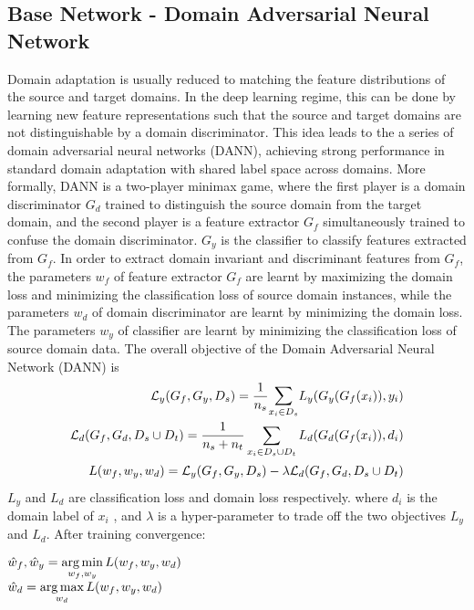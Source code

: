 \subsection{Base Network - Domain Adversarial Neural Network}
Domain adaptation is usually reduced to matching the feature distributions of the source and target domains. In the deep learning regime, this can be done by
learning new feature representations such that the source and target domains
are not distinguishable by a domain discriminator. This idea leads to the a series
of domain adversarial neural networks (DANN)\cite{uda,dann,deeptransfer}, achieving strong performance
in standard domain adaptation with shared label space across domains.
More formally, DANN is a two-player minimax game, where the first player is
a domain discriminator $G_d$ trained to distinguish the source domain from the
target domain, and the second player is a feature extractor $G_f$ simultaneously
trained to confuse the domain discriminator. $G_y$ is the classifier to classify features extracted from $G_f$.
In order to extract domain invariant and discriminant features from $G_f$, the parameters $w_f$ of feature extractor $G_f$ are learnt by maximizing the domain loss and minimizing the classification loss of source domain instances, while the parameters $w_d$ of domain discriminator are learnt by minimizing the domain loss. The parameters $w_y$ of classifier are learnt by minimizing the classification loss of source domain data.
The overall objective of the Domain Adversarial Neural Network (DANN) is
\begin{equation}
\begin{align}
    \mathcal{L}_y(G_f, G_y, D_s)  = \dfrac{1}{n_{s}} \mathlarger\sum\limits_{x_i \in D_s} L_y(G_y(G_f(x_i)),y_i)\\
     \mathcal{L}_d(G_f, G_d, D_s \cup D_t) = \dfrac{1}{n_s + n_t} \sum\limits_{x_i \in {D_s \cup D_t}} L_d(G_d(G_f(x_i)),d_i)\\
     L(w_f, w_y, w_d) = \mathcal{L}_y(G_f, G_y, D_s) - \lambda \mathcal{L}_d(G_f, G_d, D_s \cup D_t)
\end{align}
\end{equation}
$L_y$ and $L_d$ are classification loss and domain loss respectively. where $d_i$ is the domain label of $x_i$ , and $\lambda$ is a hyper-parameter to trade off the
two objectives $L_y$ and $L_d$. After training convergence:
\begin{center}
    $\hat{w}_f, \hat{w}_y  = \operatorname*{arg\,min} \limits_{w_f, w_y} L(w_f, w_y, w_d)$\\
    $\hat{w}_d  = \operatorname*{arg\,max} \limits_{w_d} L(w_f, w_y, w_d)$
\end{center}



